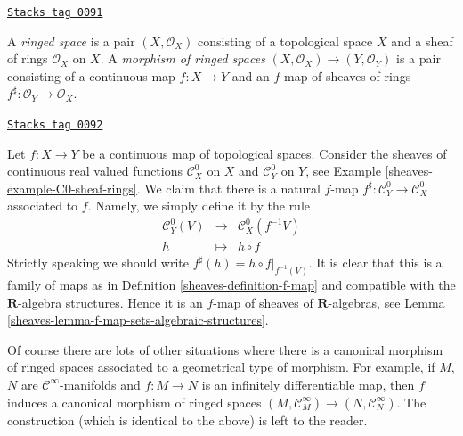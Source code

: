\begin{definition}
\label{sheaves-definition-ringed-space}
\href{https://stacks.math.columbia.edu/tag/0091}{\texttt{Stacks tag 0091}}

A {\it ringed space} is a pair $(X, \mathcal{O}_X)$ consisting
of a topological space $X$ and a sheaf of rings $\mathcal{O}_X$
on $X$. A {\it morphism of ringed spaces}
$(X, \mathcal{O}_X) \to (Y, \mathcal{O}_Y)$ is a pair
consisting of a continuous map $f : X \to Y$ and an
$f$-map of sheaves of rings
$f^\sharp : \mathcal{O}_Y \to \mathcal{O}_X$.
\end{definition}

\begin{example}
\label{sheaves-example-continuous-map-ringed}
\href{https://stacks.math.columbia.edu/tag/0092}{\texttt{Stacks tag 0092}}

Let $f : X \to Y$ be a continuous map of topological spaces.
Consider the sheaves of continuous real valued functions
$\mathcal{C}^0_X$ on $X$ and $\mathcal{C}^0_Y$ on $Y$,
see Example \ref{sheaves-example-C0-sheaf-rings}. We claim that there
is a natural $f$-map $f^\sharp : \mathcal{C}^0_Y \to \mathcal{C}^0_X$
associated to $f$. Namely, we simply define it by the
rule
\begin{eqnarray*}
\mathcal{C}^0_Y(V) & \longrightarrow & \mathcal{C}^0_X(f^{-1}V) \\
h & \longmapsto & h \circ f
\end{eqnarray*}
Strictly speaking we should write $f^\sharp(h) = h \circ f|_{f^{-1}(V)}$.
It is clear that this is a family of maps as in
Definition \ref{sheaves-definition-f-map} and compatible with the $\mathbf{R}$-algebra
structures. Hence it is an $f$-map of sheaves of $\mathbf{R}$-algebras, see
Lemma \ref{sheaves-lemma-f-map-sets-algebraic-structures}.

\medskip\noindent
Of course there are lots of other situations where there is
a canonical morphism of ringed spaces associated to a geometrical
type of morphism. For example, if $M$, $N$ are $\mathcal{C}^\infty$-manifolds
and $f : M \to N$ is an infinitely differentiable map, then
$f$ induces a canonical morphism of ringed spaces
$(M, \mathcal{C}_M^\infty) \to (N, \mathcal{C}^\infty_N)$.
The construction (which is identical to the above) is left
to the reader.
\end{example}

